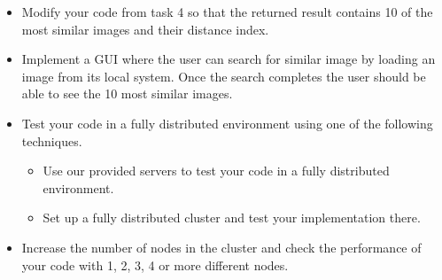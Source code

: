 \documentclass[paper=a4, fontsize=11pt]{scrartcl} %
\numberwithin{equation}{section} %
\numberwithin{figure}{section} %
\numberwithin{table}{section} %
\begin{document}
\begin{itemize}
\item Modify your code from task 4 so that the returned result contains 10 of the most similar images and their distance index.
\item Implement a GUI where the user can search for similar image by loading an image
from its local system. Once the search completes the user should be able to see the
10 most similar images.
\item Test your code in a fully distributed environment using one of the following
techniques.
	\begin{itemize}
	\item Use our provided servers to test your code in a fully distributed environment.
	\item Set up a fully distributed cluster and test your implementation there.
	\end{itemize}
\item Increase the number of nodes in the cluster and check the performance of your code
with 1, 2, 3, 4 or more different nodes.
\end{itemize}
\end{document}
